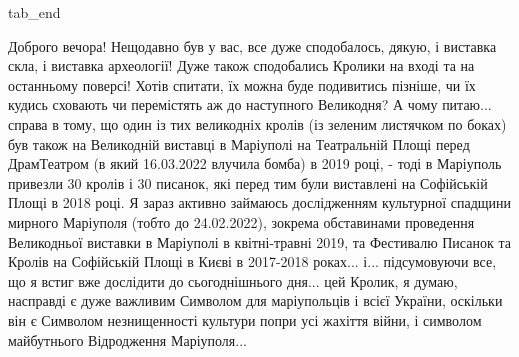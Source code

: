 
  tab_end
\fi




Доброго вечора! Нещодавно був у вас, все дуже сподобалось, дякую, і виставка
скла, і виставка археології! Дуже також сподобались Кролики на вході та на
останньому поверсі! Хотів спитати, їх можна буде подивитись пізніше, чи їх
кудись сховають чи перемістять аж до наступного Великодня? А чому питаю...
справа в тому, що один із тих великодніх кролів (із зеленим листячком по боках)
був також на Великодній виставці в Маріуполі на Театральній Площі перед
ДрамТеатром (в який 16.03.2022 влучила бомба) в 2019 році, - тоді в Маріуполь
привезли 30 кролів і 30 писанок, які перед тим були виставлені на Софійській
Площі в 2018 році. Я зараз активно займаюсь дослідженням культурної спадщини
мирного Маріуполя (тобто до 24.02.2022), зокрема обставинами проведення
Великодньої виставки в Маріуполі в квітні-травні 2019, та Фестивалю Писанок та
Кролів на Софійській Площі в Києві в 2017-2018 роках... і... підсумовуючи все,
що я встиг вже дослідити до сьогоднішнього дня... цей Кролик, я думаю,
насправді є дуже важливим Символом для маріупольців і всієї України, оскільки
він є Символом незнищенності культури попри усі жахіття війни, і символом
майбутнього Відродження Маріуполя...

